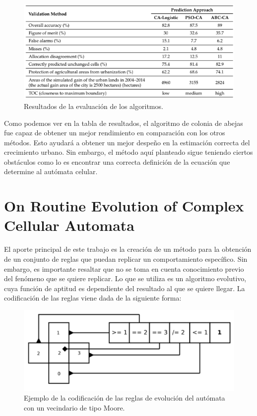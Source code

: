 \begin{figure}[H]
	\centering
	\includegraphics[width=\linewidth]{fig/results}
	\caption{Resultados de la evaluación de los algoritmos. }
	\label{fig:results}
\end{figure}

Como podemos ver en la tabla de resultados, el algoritmo de colonia de abejas fue capaz de obtener un mejor rendimiento en comparación con los otros métodos. Esto ayudará a obtener un mejor despeño en la estimación correcta del crecimiento urbano. Sin embargo, el método aquí planteado sigue teniendo ciertos obstáculos como lo es encontrar una correcta definición de la ecuación que determine al autómata celular.

\section{On Routine Evolution of Complex Cellular Automata}

El aporte principal de este trabajo \citep{bidlo2016routine} es la creación de un método para la obtención de un conjunto de reglas que puedan replicar un comportamiento específico. Sin embargo, es importante resaltar que no se toma en cuenta conocimiento previo del fenómeno que se quiere replicar. Lo que se utiliza es un algoritmo evolutivo, cuya función de aptitud es dependiente del resultado al que se quiere llegar. La codificación de las reglas viene dada de la siguiente forma:

\begin{figure}[H]
	\centering
	\includegraphics[width=\linewidth]{fig/rulesencoding}
	\caption{Ejemplo de la codificación de las reglas de evolución del autómata con un vecindario de tipo Moore.}
	\label{fig:rulesencoding}
\end{figure}
